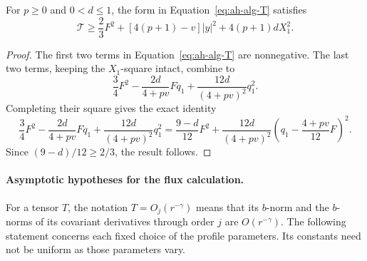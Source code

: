 \begin{lemma}
\label{lem:ah-alg-coercivity}
For \(p\ge0\) and \(0<d\le1\), the form in
Equation~\eqref{eq:ah-alg-T} satisfies
\begin{equation}
 \mathcal T\ge\frac23F^2+[4(p+1)-v]|y|^2
                    +4(p+1)dX_1^2 .
 \label{eq:ah-alg-coercivity}
\end{equation}
\end{lemma}

\begin{proof}
The first two terms in Equation~\eqref{eq:ah-alg-T} are nonnegative.
The last two terms, keeping the \(X_1\)-square intact, combine to
\[
 \frac34F^2-\frac{2d}{4+pv}Fq_1
                +\frac{12d}{(4+pv)^2}q_1^2.
\]
Completing their square gives the exact identity
\begin{equation}
 \frac34F^2-\frac{2d}{4+pv}Fq_1
       +\frac{12d}{(4+pv)^2}q_1^2
   =\frac{9-d}{12}F^2
      +\frac{12d}{(4+pv)^2}
          \left(q_1-\frac{4+pv}{12}F\right)^2.
 \label{eq:ah-alg-q-minimum}
\end{equation}
Since \((9-d)/12\ge2/3\), the result follows.
\end{proof}

\paragraph{Asymptotic hypotheses for the flux calculation.}
For a tensor \(T\), the notation \(T=O_j(r^{-\gamma})\) means that
its \(b\)-norm and the \(b\)-norms of its covariant derivatives through
order \(j\) are \(O(r^{-\gamma})\).  The following statement concerns
each fixed choice of the profile parameters.  Its constants need not
be uniform as those parameters vary.


